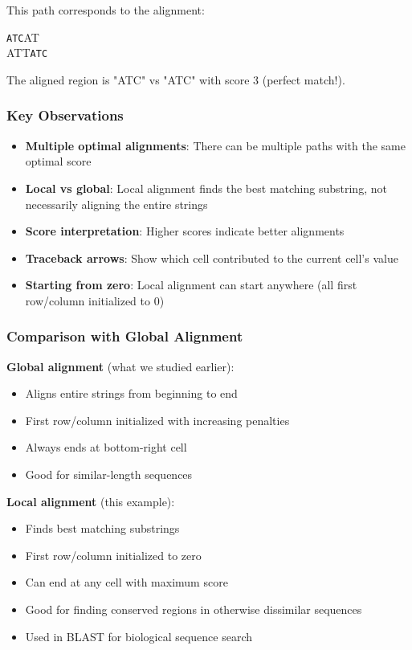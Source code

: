 \documentclass[11pt,a4paper]{article}
\theoremstyle{definition}
\theoremstyle{plain}
\theoremstyle{remark}
\begin{document}
This path corresponds to the alignment:
\begin{center}
\texttt{ATC}AT \\
ATT\texttt{ATC}
\end{center}

The aligned region is "ATC" vs "ATC" with score 3 (perfect match!).

\subsubsection{Key Observations}

\begin{itemize}
    \item \textbf{Multiple optimal alignments}: There can be multiple paths with the same optimal score
    \item \textbf{Local vs global}: Local alignment finds the best matching substring, not necessarily aligning the entire strings
    \item \textbf{Score interpretation}: Higher scores indicate better alignments
    \item \textbf{Traceback arrows}: Show which cell contributed to the current cell's value
    \item \textbf{Starting from zero}: Local alignment can start anywhere (all first row/column initialized to 0)
\end{itemize}

\subsubsection{Comparison with Global Alignment}

\textbf{Global alignment} (what we studied earlier):
\begin{itemize}
    \item Aligns entire strings from beginning to end
    \item First row/column initialized with increasing penalties
    \item Always ends at bottom-right cell
    \item Good for similar-length sequences
\end{itemize}

\textbf{Local alignment} (this example):
\begin{itemize}
    \item Finds best matching substrings
    \item First row/column initialized to zero
    \item Can end at any cell with maximum score
    \item Good for finding conserved regions in otherwise dissimilar sequences
    \item Used in BLAST for biological sequence search
\end{itemize}
\end{document}
